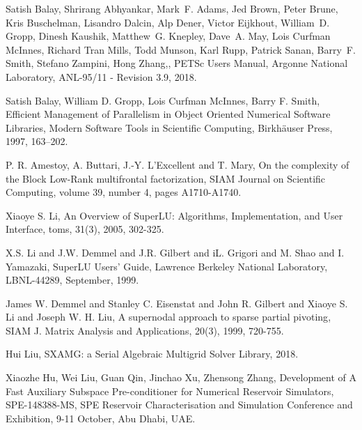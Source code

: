\begin{thebibliography}{99}
    {Satish Balay,  Shrirang Abhyankar,  Mark~F. Adams,  Jed Brown,  Peter Brune,  Kris Buschelman,  Lisandro
        Dalcin,  Alp Dener,  Victor Eijkhout,  William~D. Gropp,  Dinesh Kaushik,  Matthew~G. Knepley,
        Dave~A. May,  Lois Curfman McInnes,  Richard Tran Mills,  Todd Munson,  Karl Rupp,  Patrick Sanan,
        Barry~F. Smith,  Stefano Zampini,  Hong Zhang,}, {{PETS}c Users Manual}, {Argonne National
        Laboratory}, {ANL-95/11 - Revision 3.9}, 2018.

    Satish Balay,  William D. Gropp, Lois Curfman McInnes,  Barry F. Smith,
    Efficient Management of Parallelism in Object Oriented Numerical Software Libraries,
    Modern Software Tools in Scientific Computing, Birkh{\"{a}}user Press,
    1997, 163--202.

    P. R. Amestoy, A. Buttari, J.-Y. L'Excellent and T. Mary, On the complexity of the Block Low-Rank
    multifrontal factorization, SIAM Journal on Scientific Computing, volume 39, number 4, pages
    A1710-A1740.

    {Xiaoye S. Li}, {An Overview of {SuperLU}: Algorithms, Implementation, and User Interface},
    toms, 31(3), {2005}, {302-325}.

     {X.S. Li and J.W. Demmel and J.R. Gilbert and iL. Grigori and M. Shao and I. Yamazaki},
     {{SuperLU Users' Guide}}, {Lawrence Berkeley National Laboratory},
     {LBNL-44289}, {September}, {1999}.

    {James W. Demmel and Stanley C. Eisenstat and John R. Gilbert and Xiaoye S. Li and Joseph W. H. Liu},
    {A supernodal approach to sparse partial pivoting}, {SIAM J. Matrix Analysis and Applications},
    20(3), {1999}, {720-755}.

    Hui Liu, SXAMG: a Serial Algebraic Multigrid Solver Library, 2018.

    Xiaozhe Hu, Wei Liu, Guan Qin, Jinchao Xu, Zhensong Zhang,
    Development of A Fast Auxiliary Subspace Pre-conditioner for Numerical Reservoir Simulators,
    SPE-148388-MS, SPE Reservoir Characterisation and Simulation Conference and Exhibition, 9-11 October, Abu Dhabi, UAE.

\end{thebibliography}
